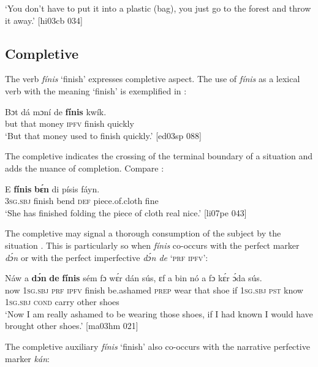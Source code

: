 \glt ‘You don’t have to put it into a plastic (bag), you just go to the 
forest and throw it away.’ [hi03cb 034]
\z

\subsection{Completive}\label{sec:6.4.3}

The verb \textit{fínis} ‘finish’ expresses completive aspect. The use of \textit{fínis} as a lexical verb with the meaning ‘finish’ is exemplified in : 

\ea%
    \label{ex:key:362}
    \gll Bɔt  dá  mɔní  de  \textbf{fínis}    kwík.\\
but  that  money  \textsc{ipfv}  finish  quickly\\

\glt ‘But that money used to finish quickly.’ [ed03sp 088]
\z

The completive indicates the crossing of the terminal boundary of a situation and adds the nuance of completion. Compare :


\ea%
    \label{ex:key:363}
    \gll E    \textbf{fínis}  \textbf{bɛ́n}    di  písis        fáyn.\\
\textsc{3sg.sbj}  finish  bend  \textsc{def}  piece.of.cloth    fine\\

\glt ‘She has finished folding the piece of cloth real nice.’ [li07pe 043]
\z

The completive may signal a thorough consumption of the subject by the situation . This is particularly so when \textit{fínis} co-occurs with the perfect marker \textit{dɔ́n} or with the perfect imperfective \textit{dɔ́n de} ‘\textsc{prf} \textsc{ipfv}’: 


\ea%
    \label{ex:key:364}
    \gll Náw  a    \textbf{dɔ́n}    \textbf{de}  \textbf{fínis}  sém      fɔ  wɛ́r    dán    sús,
ɛf  a    bin  nó    a    fɔ    kɛ́r    ɔ́da    sús.\\
now  \textsc{1sg.sbj}  \textsc{prf}    \textsc{ipfv}  finish  be.ashamed  \textsc{prep}  wear  that    shoe
if  \textsc{1sg.sbj}  \textsc{pst}  know  \textsc{1sg.sbj}  \textsc{cond}    carry  other  shoes\\

\glt ‘Now I am really ashamed to be wearing those shoes, if I had known I would have 
brought other shoes.’ [ma03hm 021]
\z

The completive auxiliary \textit{fínis} ‘finish’ also co-occurs with the narrative perfective marker \textit{kán}:


